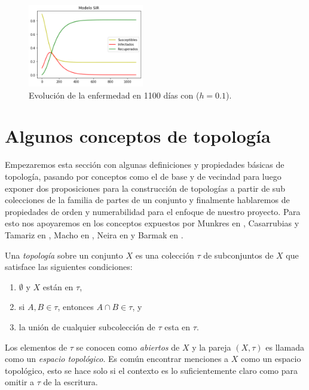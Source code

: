 \begin{figure}[h]
  \centering
    \includegraphics[width=0.45\textwidth]{Imagenes/ex1SIR.PNG}
  \caption{\centering Evolución de la enfermedad en 1100 días con ($h=0.1$).}
  \label{fig:Ejemplo 2 - SIR}
\end{figure}


\section{Algunos conceptos de topología}\label{sec:NocionesTopología}

Empezaremos esta sección con algunas definiciones y propiedades básicas de topología, pasando por conceptos como el de base y de vecindad para luego exponer dos proposiciones para la construcción de topologías a partir de sub colecciones de la familia de partes de un conjunto y finalmente hablaremos de propiedades de orden y numerabilidad para el enfoque de nuestro proyecto. Para esto nos apoyaremos en los conceptos expuestos por Munkres en \cite{munkres}, Casarrubias y Tamariz en \cite{elementosTopologiaGeneral}, Macho en \cite{stadler2002}, Neira en \cite{NeiraNacional} y Barmak en \cite{barmak2011}.

\begin{definition}\label{def:topologia}
Una \textit{topología} sobre un conjunto $X$ es una colección $\tau$ de subconjuntos de $X$ que satisface las siguientes condiciones:
\begin{enumerate}
    \item $\emptyset$ y $X$ están en $\tau$,
    \item si $A,B\in\tau$, entonces $A\cap B\in\tau$, y 
    \item la unión de cualquier subcolección de $\tau$ esta en $\tau$.
\end{enumerate}
Los elementos de $\tau$ se conocen como \textit{abiertos} de $X$ y la pareja $(X,\tau)$ es llamada como un \textit{espacio topológico}. Es común encontrar menciones a $X$ como un espacio topológico, esto se hace solo si el contexto es lo suficientemente claro como para omitir a $\tau$ de la escritura.
\end{definition}

